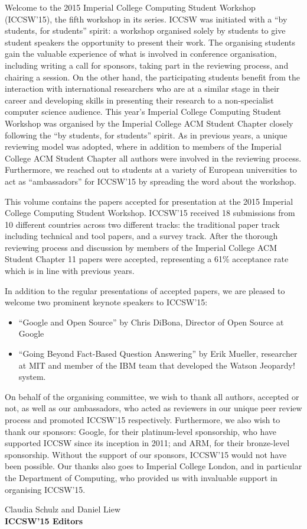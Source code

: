 Welcome to the 2015 Imperial College Computing Student Workshop (ICCSW’15), the
fifth workshop in its series. ICCSW was initiated with a “by students, for
students” spirit: a workshop organised solely by students to give student
speakers the opportunity to present their work. The organising students gain
the valuable experience of what is involved in conference organisation,
including writing a call for sponsors, taking part in the reviewing process,
and chairing a session. On the other hand, the participating students benefit
from the interaction with international researchers who are at a similar stage
in their career and developing skills in presenting their research to a
non-specialist computer science audience. This year’s Imperial College
Computing Student Workshop was organised by the Imperial College ACM Student
Chapter closely following the “by students, for students” spirit. As in
previous years, a unique reviewing model was adopted, where in addition to
members of the Imperial College ACM Student Chapter all authors were involved
in the reviewing process. Furthermore, we reached out to students at a variety
of European universities to act as “ambassadors” for ICCSW’15 by spreading the
word about the workshop.

This volume contains the papers accepted for presentation at the 2015 Imperial
College Computing Student Workshop. ICCSW’15 received 18 submissions from 10
different countries across two different tracks: the traditional paper track
including technical and tool papers, and a survey track. After the thorough
reviewing process and discussion by members of the Imperial College ACM Student
Chapter 11 papers were accepted, representing a 61\% acceptance rate which is in
line with previous years.

In addition to the regular presentations of accepted papers, we are pleased to
welcome two prominent keynote speakers to ICCSW’15:

\begin{itemize}
  \item ``Google and Open Source'' by Chris DiBona, Director of Open Source at
Google
  \item ``Going Beyond Fact-Based Question Answering'' by Erik Mueller,
researcher at MIT and member of the IBM team that developed the Watson
Jeopardy! system.
\end{itemize}

On behalf of the organising committee, we wish to thank all authors, accepted
or not, as well as our ambassadors, who acted as reviewers in our unique peer
review process and promoted ICCSW’15 respectively. Furthermore, we also wish to
thank our sponsors: Google, for their platinum-level sponsorship, who have
supported ICCSW since its inception in 2011; and ARM, for their bronze-level
sponsorship.  Without the support of our sponsors, ICCSW’15 would not have been
possible. Our thanks also goes to Imperial College London, and in particular
the Department of Computing, who provided us with invaluable support in
organising ICCSW’15.
\vspace{5ex}

\noindent Claudia Schulz and Daniel Liew \\
\textbf{ICCSW’15 Editors}
